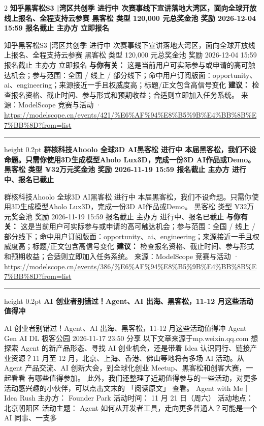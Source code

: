 \documentclass[10.5pt]{ctexart}
\begin{document}
\begin{multicols}{2}
{\large\bfseries 知乎黑客松S3 |湾区共创季 进行中 次赛事线下宣讲落地大湾区，面向全球开放线上报名、全程支持云参赛 黑客松 类型 120,000 元总奖金池 奖励 2026-12-04 15:59 报名截止 主办方 立即报名}\par
知乎黑客松S3 |湾区共创季 进行中 次赛事线下宣讲落地大湾区，面向全球开放线上报名、全程支持云参赛 黑客松 类型 120,000 元总奖金池 奖励 2026-12-04 15:59 报名截止 主办方 立即报名
\textbf{与你有关：} 这是当前用户可实际参与或申请的高可触达机会；参与范围：全国 / 线上 / 部分线下；命中用户订阅版面：opportunity、ai、engineering；来源接近一手且权威度高；标题/正文包含高信号变化
\textbf{建议：} 检查报名资格、截止时间、参与形式和预期收益；合适则立即加入任务系统。
{\footnotesize\color{ormuted} 来源：ModelScope 竞赛与活动 · \url{https://modelscope.cn/events/421/%E6%AF%94%E8%B5%9B%E4%BB%8B%E7%BB%8D?from=list}}
\vspace{2mm}
\hrule height 0.2pt
\vspace{2mm}
{\large\bfseries 群核科技Ahoolo 全球3D AI黑客松 进行中 本届黑客松，我们不设命题。只需你使用3D生成模型Aholo Lux3D，完成一份3D AI作品或Demo。 黑客松 类型 ¥32万元奖金池 奖励 2026-11-19 15:59 报名截止 主办方 进行中、报名已截止}\par
群核科技Ahoolo 全球3D AI黑客松 进行中 本届黑客松，我们不设命题。只需你使用3D生成模型Aholo Lux3D，完成一份3D AI作品或Demo。 黑客松 类型 ¥32万元奖金池 奖励 2026-11-19 15:59 报名截止 主办方 进行中、报名已截止
\textbf{与你有关：} 这是当前用户可实际参与或申请的高可触达机会；参与范围：全国 / 线上 / 部分线下；命中用户订阅版面：opportunity、ai、engineering；来源接近一手且权威度高；标题/正文包含高信号变化
\textbf{建议：} 检查报名资格、截止时间、参与形式和预期收益；合适则立即加入任务系统。
{\footnotesize\color{ormuted} 来源：ModelScope 竞赛与活动 · \url{https://modelscope.cn/events/386/%E6%AF%94%E8%B5%9B%E4%BB%8B%E7%BB%8D?from=list}}
\vspace{2mm}
\hrule height 0.2pt
\vspace{2mm}
{\large\bfseries AI 创业者别错过！Agent、AI 出海、黑客松，11-12 月这些活动值得冲}\par
AI 创业者别错过！Agent、AI 出海、黑客松，11-12 月这些活动值得冲 Agent Gen AI DL 极客公园 2026-11-17 23:50 分享 以下文章来源于mp.weixin.qq.com 想探索 Agent 的新产品形态、寻找 AI 创业机会，还是带着 Idea 认识同行、链接产业资源？11 月至 12 月，北京、上海、香港、佛山等地将有多场 AI 活动。从 Agent 产品交流、AI 创新大会，到全球化创业 Meetup、黑客松和创客大赛，一起看看 有哪些值得参加。 此外，我们还整理了近期值得参与的一些活动，对更多活动感兴趣的小伙伴，可以点击文末的 「阅读原文」 查看。 Agent with Me｜Idea Rush 主办方： Founder Park 活动时间： 11 月 21 日（周六） 活动地点： 北京朝阳区 活动主题： Agent 如何从开发者工具，走向更多普通人？可能是一个 AI 同事、一支多

\end{multicols}
\end{document}

